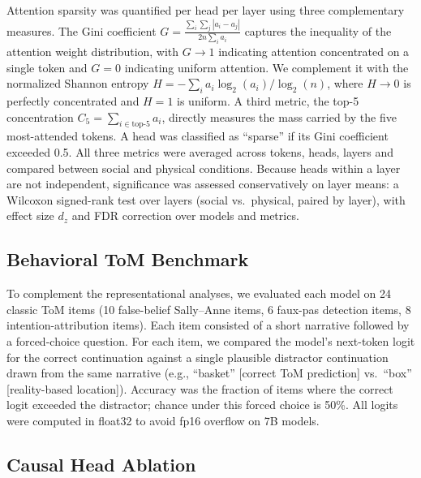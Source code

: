 \documentclass[conference]{IEEEtran}
\begin{document}
Attention sparsity was quantified per head per layer using three complementary measures. The Gini coefficient \cite{hoyer2004non}
$G = \frac{\sum_{i}\sum_{j}|a_i - a_j|}{2n\sum_i a_i}$
captures the inequality of the attention weight distribution, with $G \rightarrow 1$ indicating attention concentrated on a single token and $G = 0$ indicating uniform attention. We complement it with the normalized Shannon entropy $H = -\sum_i a_i \log_2(a_i) / \log_2(n)$, where $H \rightarrow 0$ is perfectly concentrated and $H = 1$ is uniform. A third metric, the top-5 concentration $C_5 = \sum_{i \in \text{top-5}} a_i$, directly measures the mass carried by the five most-attended tokens. A head was classified as ``sparse'' if its Gini coefficient exceeded 0.5. All three metrics were averaged across tokens, heads, layers and compared between social and physical conditions. Because heads within a layer are not independent, significance was assessed conservatively on layer means: a Wilcoxon signed-rank test over layers (social vs.\ physical, paired by layer), with effect size $d_z$ and FDR correction over models and metrics.

\subsection{Behavioral ToM Benchmark}

To complement the representational analyses, we evaluated each model on 24 classic ToM items (10 false-belief Sally--Anne items, 6 faux-pas detection items, 8 intention-attribution items). Each item consisted of a short narrative followed by a forced-choice question. For each item, we compared the model's next-token logit for the correct continuation against a single plausible distractor continuation drawn from the same narrative (e.g., ``basket'' [correct ToM prediction] vs.\ ``box'' [reality-based location]). Accuracy was the fraction of items where the correct logit exceeded the distractor; chance under this forced choice is 50\%. All logits were computed in float32 to avoid fp16 overflow on 7B models.

\subsection{Causal Head Ablation}
\label{sec:methods:ablation}
\end{document}
